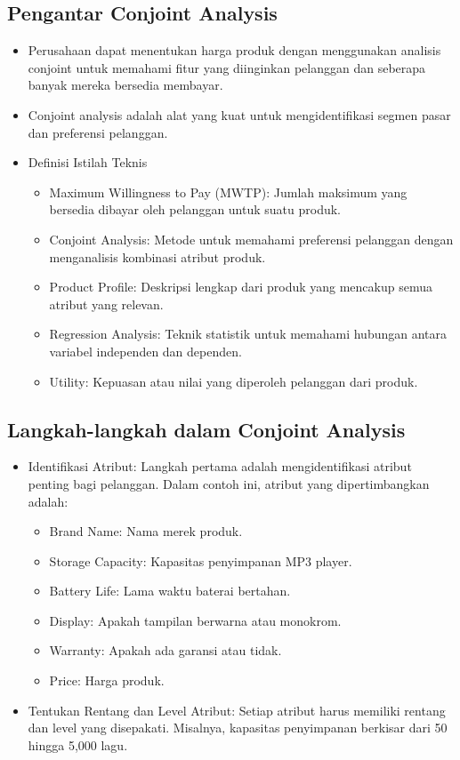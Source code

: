 \documentclass{article}
\begin{document}
\subsection{Pengantar Conjoint Analysis}
\begin{itemize}
    \item Perusahaan dapat menentukan harga produk dengan menggunakan analisis conjoint untuk memahami fitur yang diinginkan pelanggan dan seberapa banyak mereka bersedia membayar.
    \item Conjoint analysis adalah alat yang kuat untuk mengidentifikasi segmen pasar dan preferensi pelanggan.
    \item Definisi Istilah Teknis
          \begin{itemize}
              \item Maximum Willingness to Pay (MWTP): Jumlah maksimum yang bersedia dibayar oleh pelanggan untuk suatu produk.
              \item Conjoint Analysis: Metode untuk memahami preferensi pelanggan dengan menganalisis kombinasi atribut produk.
              \item Product Profile: Deskripsi lengkap dari produk yang mencakup semua atribut yang relevan.
              \item Regression Analysis: Teknik statistik untuk memahami hubungan antara variabel independen dan dependen.
              \item Utility: Kepuasan atau nilai yang diperoleh pelanggan dari produk.
          \end{itemize}
\end{itemize}

\subsection{Langkah-langkah dalam Conjoint Analysis}
\begin{itemize}
    \item Identifikasi Atribut: Langkah pertama adalah mengidentifikasi atribut penting bagi pelanggan. Dalam contoh ini, atribut yang dipertimbangkan adalah:
          \begin{itemize}
              \item Brand Name: Nama merek produk.
              \item Storage Capacity: Kapasitas penyimpanan MP3 player.
              \item Battery Life: Lama waktu baterai bertahan.
              \item Display: Apakah tampilan berwarna atau monokrom.
              \item Warranty: Apakah ada garansi atau tidak.
              \item Price: Harga produk.
          \end{itemize}
    \item Tentukan Rentang dan Level Atribut: Setiap atribut harus memiliki rentang dan level yang disepakati. Misalnya, kapasitas penyimpanan berkisar dari 50 hingga 5,000 lagu.
\end{itemize}
\end{document}
